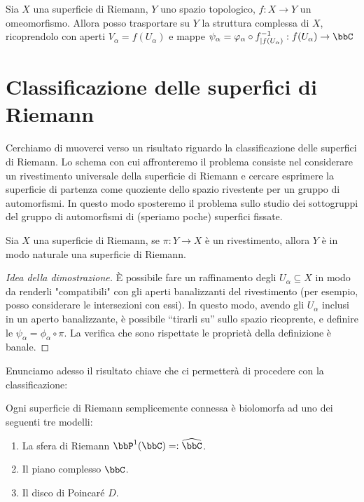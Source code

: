 \begin{osservazione}
Sia $X$ una superficie di Riemann, $Y$ uno spazio topologico, $f:X\rightarrow Y$ un omeomorfismo. Allora posso trasportare su $Y$ la struttura complessa di $X$, ricoprendolo con aperti $V_\alpha=f(U_\alpha)$ e mappe $\psi_\alpha=\varphi_\alpha \circ f^{-1}_{|f(U_\alpha)}:f(U_\alpha)\rightarrow\bbC$
\end{osservazione}


\section{Classificazione delle superfici di Riemann}
Cerchiamo di muoverci verso un risultato riguardo la classificazione delle superfici di Riemann. Lo schema con cui affronteremo il problema consiste nel considerare un rivestimento universale della superficie di Riemann e cercare esprimere la superficie di partenza come quoziente dello spazio rivestente per un gruppo di automorfismi. In questo modo sposteremo il problema sullo studio dei sottogruppi del gruppo di automorfismi di (speriamo poche) superfici fissate.
\begin{osservazione}
Sia $X$ una superficie di Riemann, se $\pi:Y\rightarrow X$ è un rivestimento, allora $Y$ è in modo naturale una superficie di Riemann.
\end{osservazione} 
\begin{proof}[Idea della dimostrazione]
È possibile fare un raffinamento degli $U_\alpha\subseteq X$ in modo da renderli "compatibili" con gli aperti banalizzanti del rivestimento (per esempio, posso considerare le intersezioni con essi). In questo modo, avendo gli $U_\alpha$ inclusi in un aperto banalizzante, è possibile ``tirarli su'' sullo spazio ricoprente, e definire le $\psi_\alpha=\phi_\alpha \circ \pi$. La verifica che sono rispettate le proprietà della definizione è banale.
\end{proof}
Enunciamo adesso il risultato chiave che ci permetterà di procedere con la classificazione:
\begin{teorema}[di Riemann]
Ogni superficie di Riemann semplicemente connessa è biolomorfa ad uno dei seguenti tre modelli:
\begin{enumerate}
  \item La sfera di Riemann $\bbP^1(\bbC)=:\widehat{\bbC}$.
  \item Il piano complesso $\bbC$.
  \item Il disco di Poincaré $D$.
\end{enumerate}
\end{teorema} 
